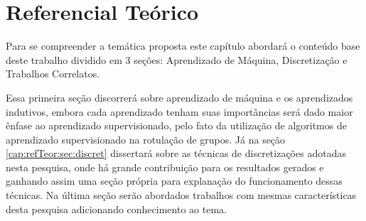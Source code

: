 \chapter{Referencial Teórico}\label{cap:refTeor}


Para se compreender a temática proposta  este capítulo abordará o conteúdo base deste trabalho dividido em 3 seções: Aprendizado de Máquina, Discretização e Trabalhos Correlatos. 





Essa primeira seção discorrerá sobre aprendizado de máquina e os aprendizados indutivos, embora cada aprendizado tenham suas importâncias será dado maior ênfase ao aprendizado supervisionado, pelo fato da utilização de algoritmos de aprendizado supervisionado na rotulação de grupos. Já na seção \ref{cap:refTeor:sec:discret} dissertará sobre as técnicas de discretizações adotadas nesta pesquisa, onde há grande contribuição para os resultados gerados e ganhando assim uma seção própria para explanação do funcionamento dessas técnicas. Na última seção serão abordados trabalhos com mesmas características desta pesquisa adicionando conhecimento ao tema.



